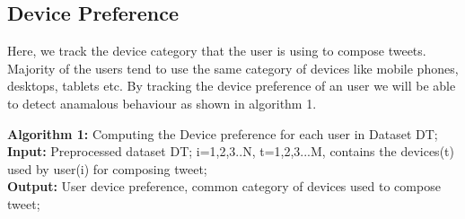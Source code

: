 \documentclass[conference]{IEEEtran}
\DeclarePairedDelimiter\floor{\lfloor}{\rfloor}
\begin{document}

\subsection{Device Preference}
Here, we track the device category that the user is using to compose tweets. Majority of the users tend to use the same category of devices like mobile phones, desktops, tablets etc. By tracking the device preference of an user we will be able to detect anamalous behaviour as shown in algorithm 1.

\textbf{Algorithm 1:} Computing the Device preference for each user in Dataset DT; \\
\textbf{Input:} Preprocessed dataset DT; i=1,2,3..N, t=1,2,3...M, contains the devices(t) used by user(i) for composing tweet;\\
\textbf{Output:} User device preference, common category of devices used to compose tweet; \\
\end{document}
